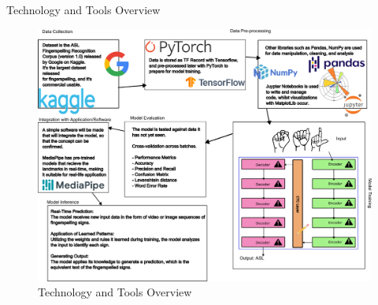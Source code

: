 \documentclass[xcolor={cmyk}]{beamer} %
\begin{document}
\begin{frame}[t]
\begin{columns}[t]
		\begin{column}{0.3\textwidth} %


			\begin{block}{Technology and Tools Overview}
				\begin{figure}
					\includegraphics[width=\linewidth]{drawing.png}
					\caption{Technology and Tools Overview}
				\end{figure}
			\end{block}



\end{column}
\end{columns}
\end{frame}
\end{document}
